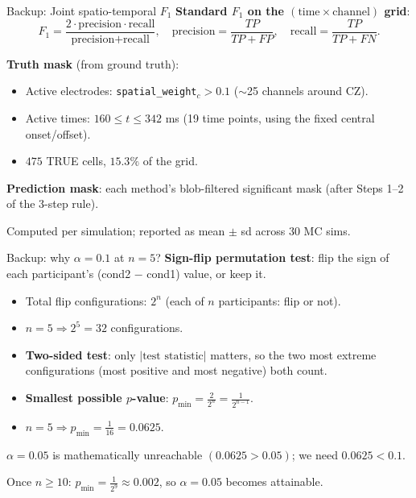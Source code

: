 \documentclass[10pt,aspectratio=169]{beamer}
\begin{document}
\begin{frame}{Backup: Joint spatio-temporal $F_1$}
  \textbf{Standard $F_1$ on the $(\text{time} \times \text{channel})$ grid}:
  \[
    F_1 = \frac{2 \cdot \text{precision} \cdot \text{recall}}
                {\text{precision} + \text{recall}},
    \quad
    \text{precision} = \frac{TP}{TP + FP},
    \quad
    \text{recall} = \frac{TP}{TP + FN}.
  \]

  \vspace{0.4em}
  \textbf{Truth mask} (from ground truth):
  \begin{itemize}\setlength{\itemsep}{0pt}
    \item Active electrodes: \texttt{spatial\_weight}$_c > 0.1$
          ($\sim$25 channels around CZ).
    \item Active times: $160 \leq t \leq 342$ ms (19 time points,
          using the fixed central onset/offset).
    \item $475$ TRUE cells, $15.3\%$ of the grid.
  \end{itemize}

  \vspace{0.4em}
  \textbf{Prediction mask}: each method's blob-filtered significant mask
  (after Steps 1--2 of the 3-step rule).

  \vspace{0.4em}
  Computed per simulation; reported as mean $\pm$ sd across 30 MC sims.
\end{frame}

\begin{frame}{Backup: why $\alpha = 0.1$ at $n = 5$?}
  \textbf{Sign-flip permutation test}: flip the sign of each participant's
  (cond2 $-$ cond1) value, or keep it.

  \vspace{0.3em}
  \begin{itemize}\setlength{\itemsep}{0pt}
    \item Total flip configurations: $2^n$
          (each of $n$ participants: flip or not).
    \item $n = 5 \Rightarrow 2^5 = 32$ configurations.
    \item \textbf{Two-sided test}: only $|\text{test statistic}|$
          matters, so the two most extreme configurations
          (most positive and most negative) both count.
    \item \textbf{Smallest possible $p$-value}:
          $\displaystyle p_{\min} = \frac{2}{2^n} = \frac{1}{2^{n-1}}.$
    \item $n = 5 \Rightarrow p_{\min} = \tfrac{1}{16} = 0.0625$.
  \end{itemize}

  \vspace{0.3em}
  $\alpha = 0.05$ is mathematically unreachable
  $(0.0625 > 0.05)$; we need $0.0625 < 0.1$.

  \vspace{0.3em}
  Once $n \geq 10$: $p_{\min} = \tfrac{1}{2^9} \approx 0.002$,
  so $\alpha = 0.05$ becomes attainable.
\end{frame}
\end{document}
